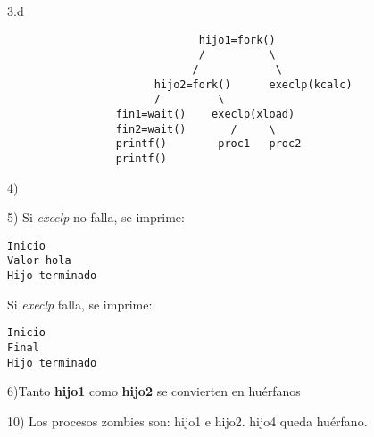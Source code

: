 \documentclass{article}
\begin{document}
3.d
\begin{verbatim}
                              hijo1=fork()
                              /          \
                             /            \
                       hijo2=fork()      execlp(kcalc)
                       /         \
                 fin1=wait()    execlp(xload)
                 fin2=wait()       /     \
                 printf()        proc1   proc2
                 printf()
\end{verbatim}

4)

5) Si \emph{execlp} no falla, se imprime:\\
\begin{verbatim}
Inicio
Valor hola
Hijo terminado
\end{verbatim}
 Si \emph{execlp} falla, se imprime:\\
\begin{verbatim}
Inicio
Final
Hijo terminado
\end{verbatim}
6)Tanto \textbf{hijo1} como \textbf{hijo2} se convierten en hu\'erfanos

10) Los procesos zombies son: hijo1 e hijo2. hijo4 queda hu\'erfano.
\end{document}
